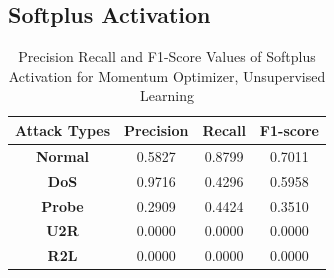 \documentclass[12pt, a4paper]{report}
\begin{document}
\begin{appendices}
   \subsection{Softplus Activation}
  \begin{table}[h]
		\centering
		\captionsetup{justification=centering,margin=2cm}
		\begin{tabular}{|c|c|c|c|}
		\hline
		\textbf{Attack Types} & \textbf{Precision} & \textbf{Recall} & \textbf{F1-score} \\ \hline
		\textbf{Normal}       & 0.5827             & 0.8799          & 0.7011            \\ \hline
		\textbf{DoS}          & 0.9716             & 0.4296          & 0.5958            \\ \hline
		\textbf{Probe}        & 0.2909             & 0.4424          & 0.3510            \\ \hline
		\textbf{U2R}          & 0.0000             & 0.0000          & 0.0000            \\ \hline
		\textbf{R2L}          & 0.0000             & 0.0000          & 0.0000            \\ \hline
		\end{tabular}
		\caption{Precision Recall and F1-Score Values of Softplus Activation for Momentum Optimizer, Unsupervised Learning}
		\label{classification softplus mom tf}
		\end{table} 











  
\end{appendices}
\end{document}
